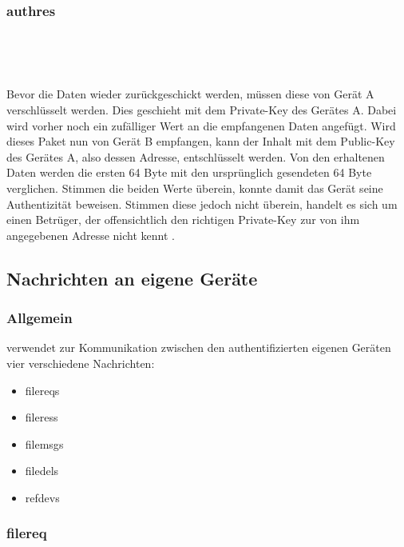 \subsubsection{\gls{authres}}
\messagestart
	 \\
	
	\begin{rightwordgroup}{\isprotomsgtype}
	\end{rightwordgroup} \\
	
	\begin{rightwordgroup}{\isprotomsgdata}
	\end{rightwordgroup}
	
Bevor die Daten wieder zurückgeschickt werden, müssen diese von Gerät A verschlüsselt werden. Dies geschieht mit dem Private-Key des Gerätes A. Dabei wird vorher noch ein zufälliger Wert an die empfangenen Daten angefügt.
Wird dieses Paket nun von Gerät B empfangen, kann der Inhalt mit dem Public-Key des Gerätes A, also dessen Adresse, entschlüsselt werden. Von den erhaltenen Daten werden die ersten 64 Byte mit den ursprünglich gesendeten 64 Byte verglichen. Stimmen die beiden Werte überein, konnte damit das Gerät seine Authentizität beweisen. Stimmen diese jedoch nicht überein, handelt es sich um einen Betrüger, der offensichtlich den richtigen Private-Key zur von ihm angegebenen Adresse nicht kennt .
		
\subsection{Nachrichten an eigene Geräte}
\subsubsection{Allgemein}
\sblitg verwendet zur Kommunikation zwischen den authentifizierten eigenen Geräten vier verschiedene Nachrichten:
\begin{itemize}
	\item \gls{filereq}s
	\item \gls{fileres}s
	\item \gls{filemsg}s
	\item \gls{filedel}s
	\item \gls{refdev}s
\end{itemize}

\subsubsection{\gls{filereq}} \label{Dateianfrage}
\messagestart
	 \\
	
